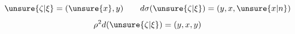 
\[
\unsure{\zeta|\xi}=(\unsure{x},y)\qquad d\sigma(\unsure{\zeta|\xi})=(y,x,\unsure{x|n})
\]
\[
\rho^2d(\unsure{\zeta|\xi})=(y,x,y)
\]


